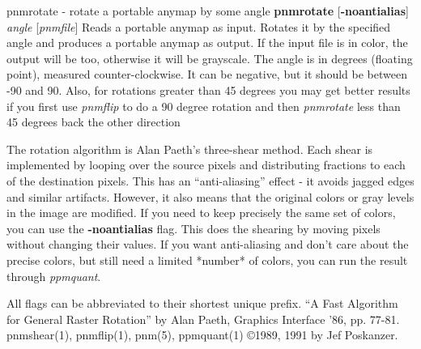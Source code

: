 \newpage
%

pnmrotate - rotate a portable anymap by some angle
{\bf pnmrotate}
{\rm [}{\bf -noantialias}{\rm ]}
{\it angle}
{\rm [}{\it pnmfile}{\rm ]}
Reads a portable anymap as input.
Rotates it by the specified angle
and produces a portable anymap as output.
If the input file is in color, the output will be too,
otherwise it will be grayscale.
The angle is in degrees (floating point), measured counter-clockwise.
It can be negative, but it should be between -90 and 90.
Also, for rotations greater than 45 degrees you may get better results
if you first use
{\it pnmflip}
to do a 90 degree rotation and then
{\it pnmrotate}
less than 45 degrees back the other direction
\par
The rotation algorithm is Alan Paeth's three-shear method.
Each shear is implemented by looping over the source pixels and distributing
fractions to each of the destination pixels.
This has an ``anti-aliasing'' effect - it avoids jagged edges and similar
artifacts.
However, it also means that the original colors or gray levels in the image
are modified.
If you need to keep precisely the same set of colors, you can use the
{\bf -noantialias}
flag.  This does the shearing by moving pixels without changing their values.
If you want anti-aliasing and don't care about the precise colors, but
still need a limited *number* of colors, you can run the result through
{\it ppmquant}{\rm .}
\par
All flags can be abbreviated to their shortest unique prefix.
``A Fast Algorithm for General Raster Rotation'' by Alan Paeth,
Graphics Interface '86, pp. 77-81.
pnmshear(1), pnmflip(1), pnm(5), ppmquant(1)
\copyright 1989, 1991 by Jef Poskanzer.
%
 
%

